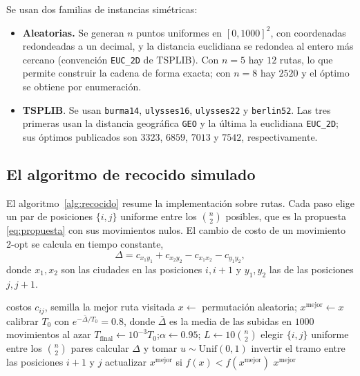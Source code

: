 Se usan dos familias de instancias simétricas:

\begin{itemize}
    \item \textbf{Aleatorias.} Se generan \(n\) puntos uniformes en
    \([0,1000]^2\), con coordenadas redondeadas a un decimal, y la
    distancia euclidiana se redondea al entero más cercano (convención
    \texttt{EUC\_2D} de TSPLIB). Con \(n=5\) hay \(12\) rutas, lo que
    permite construir la cadena de forma exacta; con \(n=8\) hay
    \(2520\) y el óptimo se obtiene por enumeración.
    \item \textbf{TSPLIB}. Se usan \texttt{burma14}, \texttt{ulysses16},
    \texttt{ulysses22} y \texttt{berlin52}. Las tres primeras usan la
    distancia geográfica \texttt{GEO} y la última la euclidiana
    \texttt{EUC\_2D}; sus óptimos publicados son \(3323\), \(6859\),
    \(7013\) y \(7542\), respectivamente.
\end{itemize}

\subsection{El algoritmo de recocido simulado}
\label{subsec:algoritmo}

El algoritmo~\ref{alg:recocido} resume la implementación sobre rutas.
Cada paso elige un par de posiciones \(\{i,j\}\) uniforme entre los
\(\binom n2\) posibles, que es la propuesta \eqref{eq:propuesta} con sus
movimientos nulos. El cambio de costo de un movimiento 2-opt se calcula
en tiempo constante,
\[
\Delta=c_{x_1y_1}+c_{x_2y_2}-c_{x_1x_2}-c_{y_1y_2},
\]
donde \(x_1,x_2\) son las ciudades en las posiciones \(i,i+1\) y
\(y_1,y_2\) las de las posiciones \(j,j+1\).

\begin{algorithm}[H]
\caption{Recocido simulado sobre rutas con vecindad 2-opt}
\label{alg:recocido}
\begin{algorithmic}[1]
\Require costos \(c_{ij}\), semilla
\Ensure la mejor ruta visitada
\State \(x\gets\) permutación aleatoria; \(x^{\mathrm{mejor}}\gets x\)
\State calibrar \(T_0\) con \(e^{-\bar\Delta/T_0}=0.8\), donde
\(\bar\Delta\) es la media de las subidas en \(1000\) movimientos al azar
\State \(T_{\mathrm{final}}\gets10^{-3}T_0\);\quad \(\alpha\gets0.95\);\quad
\(L\gets10\binom n2\)
        \State elegir \(\{i,j\}\) uniforme entre los \(\binom n2\) pares
            \State calcular \(\Delta\) y tomar \(u\sim\mathrm{Unif}(0,1)\)
                \State invertir el tramo entre las posiciones \(i+1\) y \(j\)
                \State actualizar \(x^{\mathrm{mejor}}\) si \(f(x)<f(x^{\mathrm{mejor}})\)
            \EndIf
        \EndIf
    \EndFor
\EndFor
\State \Return \(x^{\mathrm{mejor}}\)
\end{algorithmic}
\end{algorithm}

